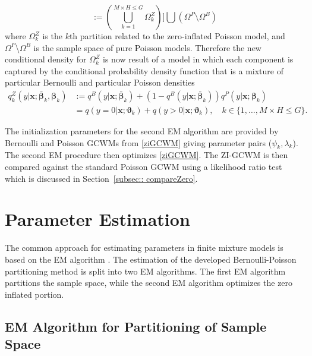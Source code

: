\documentclass[11pt,letterpaper]{article}
\numberwithin{equation}{section}
\numberwithin{equation}{section}
\numberwithin{equation}{section}
\begin{document}
$$:= \left(  \bigcup_{k=1}^{M \times H \leq G} \Omega_k^Z \right) ]\bigcup \left( \Omega^P  \setminus \Omega^B \right)  $$
where $\Omega^Z_k$ is the $k$th partition related to the zero-inflated Poisson model, and $\Omega^P \setminus \Omega^B$ is the sample space of pure Poisson models.   Therefore the new conditional density for $\Omega^Z_k$ is now result of a model in which each component is captured by the conditional probability density function that is a mixture of particular Bernoulli and particular Poisson densities
\begin{align}
q^Z_{k}(y|\bm{x};  \bm{\bar{\beta}}_k,\bm{ \beta}_k) & := q^B(y|\bm{x}; \bm{\bar{\beta}}_k) +(1-  q^B(y|\bm{x}; \bm{\bar{\beta}}_k) ) q^P(y|\bm{x};\bm{\beta}_k) \nonumber \\
& = q(y = 0|\bm{x};\bm{\vartheta}_{k} ) +  q(y > 0|\bm{x} ; \bm{\vartheta}_{k}), \quad k \in \{1 ,\ldots, M \times H \leq G \}.
\label{ziGCWM}
\end{align}

The initialization parameters for the second EM algorithm are provided by Bernoulli and Poisson GCWMs from \eqref{ziGCWM} giving parameter pairs ($ \psi_k,\lambda_k  $). The second EM procedure then optimizes \eqref{ziGCWM}. The ZI-GCWM is then compared against the standard Poisson GCWM using a likelihood ratio test which is discussed in Section~\ref{subsec:: compareZero}.

\section{Parameter Estimation}\label{sec:estmeth}

The common approach for estimating parameters in finite mixture models is based on the EM algorithm \citep[see][for examples]{mcnicholas16a}.
The estimation of the developed Bernoulli-Poisson partitioning method is split into two EM algorithms. The first EM algorithm partitions the sample space, while the second EM algorithm optimizes the zero inflated portion.

\subsection{EM Algorithm for Partitioning of Sample Space}
\end{document}
